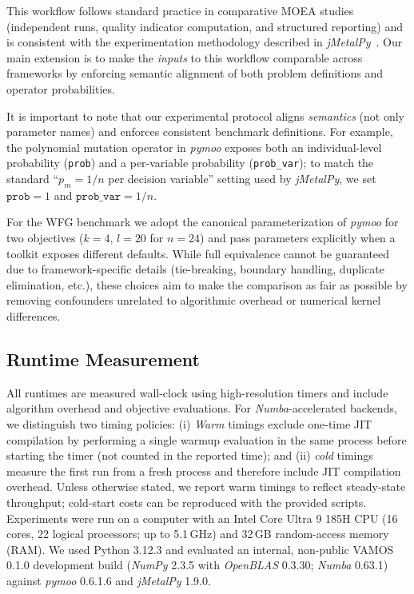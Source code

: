 \documentclass[final,5p,times,twocolumn]{elsarticle}
\newcommand{\VAMOS}{VAMOS}
\begin{document}
This workflow follows standard practice in comparative MOEA studies (independent runs, quality indicator computation, and structured reporting) and is consistent with the experimentation methodology described in \textit{jMetalPy}~\cite{BNG+19}. Our main extension is to make the \emph{inputs} to this workflow comparable across frameworks by enforcing semantic alignment of both problem definitions and operator probabilities. 

It is important to note that our experimental protocol aligns \emph{semantics} (not only parameter names) and enforces consistent benchmark definitions. For example, the polynomial mutation operator in \textit{pymoo} exposes both an individual-level probability (\texttt{prob}) and a per-variable probability (\texttt{prob\_var}); to match the standard ``$p_m=1/n$ per decision variable'' setting used by \textit{jMetalPy}, we set $\texttt{prob}=1$ and $\texttt{prob\_var}=1/n$.

For the WFG benchmark we adopt the canonical parameterization of \textit{pymoo} for two objectives ($k=4$, $l=20$ for $n=24$) and pass parameters explicitly when a toolkit exposes different defaults. While full equivalence cannot be guaranteed due to framework-specific details (tie-breaking, boundary handling, duplicate elimination, etc.), these choices aim to make the comparison as fair as possible by removing confounders unrelated to algorithmic overhead or numerical kernel differences.


\subsection{Runtime Measurement}

All runtimes are measured wall-clock using high-resolution timers and include algorithm overhead and objective evaluations. For \textit{Numba}-accelerated backends, we distinguish two timing policies: (i) \textit{Warm} timings exclude one-time JIT compilation by performing a single warmup evaluation in the same process before starting the timer (not counted in the reported time); and (ii) \textit{cold} timings measure the first run from a fresh process and therefore include JIT compilation overhead. Unless otherwise stated, we report warm timings to reflect steady-state throughput; cold-start costs can be reproduced with the provided scripts. Experiments were run on a computer with an Intel Core Ultra 9 185H CPU (16 cores, 22 logical processors; up to 5.1\,GHz) and 32\,GB random-access memory (RAM). We used Python 3.12.3 and evaluated an internal, non-public \VAMOS{} 0.1.0 development build (\textit{NumPy} 2.3.5 with \textit{OpenBLAS} 0.3.30; \textit{Numba} 0.63.1) against \textit{pymoo} 0.6.1.6 and \textit{jMetalPy} 1.9.0.
\end{document}
